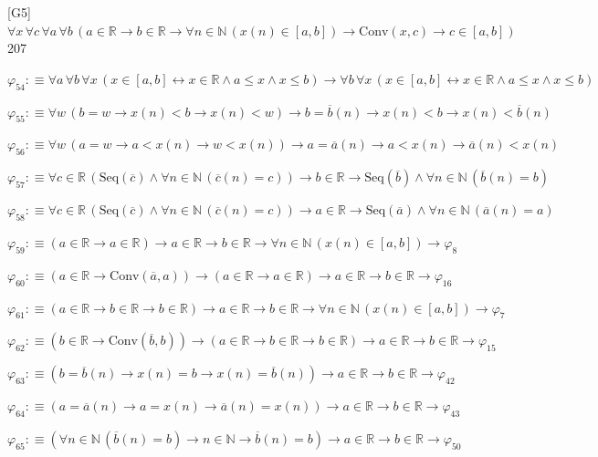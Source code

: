 \begin{fullproof}{[G5]}{$\forall x\,\forall c\,\forall a\,\forall b\,(a \in \mathbb{R} \to b \in \mathbb{R} \to \forall n \in \mathbb{N}\,(x(n) \in [a,b]) \to \mathrm{Conv}(x,c) \to c \in [a,b])$}{207}
\begin{abbrevlist}
\item $\varphi_{54} :\equiv \forall a\,\forall b\,\forall x\,(x \in [a,b] \leftrightarrow x \in \mathbb{R} \land a \leq x \land x \leq b) \to \forall b\,\forall x\,(x \in [a,b] \leftrightarrow x \in \mathbb{R} \land a \leq x \land x \leq b)$
\item $\varphi_{55} :\equiv \forall w\,(b = w \to x(n) < b \to x(n) < w) \to b = \overline{b}(n) \to x(n) < b \to x(n) < \overline{b}(n)$
\item $\varphi_{56} :\equiv \forall w\,(a = w \to a < x(n) \to w < x(n)) \to a = \overline{a}(n) \to a < x(n) \to \overline{a}(n) < x(n)$
\item $\varphi_{57} :\equiv \forall c \in \mathbb{R}\,(\mathrm{Seq}(\overline{c}) \land \forall n \in \mathbb{N}\,(\overline{c}(n) = c)) \to b \in \mathbb{R} \to \mathrm{Seq}(\overline{b}) \land \forall n \in \mathbb{N}\,(\overline{b}(n) = b)$
\item $\varphi_{58} :\equiv \forall c \in \mathbb{R}\,(\mathrm{Seq}(\overline{c}) \land \forall n \in \mathbb{N}\,(\overline{c}(n) = c)) \to a \in \mathbb{R} \to \mathrm{Seq}(\overline{a}) \land \forall n \in \mathbb{N}\,(\overline{a}(n) = a)$
\item $\varphi_{59} :\equiv (a \in \mathbb{R} \to a \in \mathbb{R}) \to a \in \mathbb{R} \to b \in \mathbb{R} \to \forall n \in \mathbb{N}\,(x(n) \in [a,b]) \to \varphi_{8}$
\item $\varphi_{60} :\equiv (a \in \mathbb{R} \to \mathrm{Conv}(\overline{a},a)) \to (a \in \mathbb{R} \to a \in \mathbb{R}) \to a \in \mathbb{R} \to b \in \mathbb{R} \to \varphi_{16}$
\item $\varphi_{61} :\equiv (a \in \mathbb{R} \to b \in \mathbb{R} \to b \in \mathbb{R}) \to a \in \mathbb{R} \to b \in \mathbb{R} \to \forall n \in \mathbb{N}\,(x(n) \in [a,b]) \to \varphi_{7}$
\item $\varphi_{62} :\equiv (b \in \mathbb{R} \to \mathrm{Conv}(\overline{b},b)) \to (a \in \mathbb{R} \to b \in \mathbb{R} \to b \in \mathbb{R}) \to a \in \mathbb{R} \to b \in \mathbb{R} \to \varphi_{15}$
\item $\varphi_{63} :\equiv (b = \overline{b}(n) \to x(n) = b \to x(n) = \overline{b}(n)) \to a \in \mathbb{R} \to b \in \mathbb{R} \to \varphi_{42}$
\item $\varphi_{64} :\equiv (a = \overline{a}(n) \to a = x(n) \to \overline{a}(n) = x(n)) \to a \in \mathbb{R} \to b \in \mathbb{R} \to \varphi_{43}$
\item $\varphi_{65} :\equiv (\forall n \in \mathbb{N}\,(\overline{b}(n) = b) \to n \in \mathbb{N} \to \overline{b}(n) = b) \to a \in \mathbb{R} \to b \in \mathbb{R} \to \varphi_{50}$

\end{abbrevlist}
\end{fullproof}
